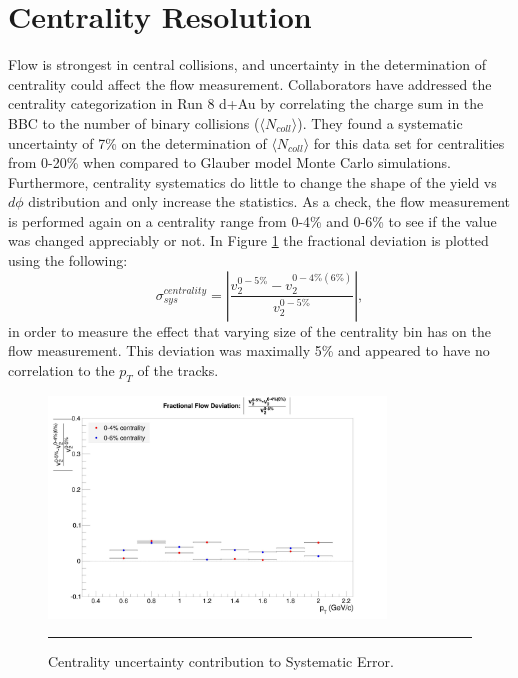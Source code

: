 \section{Centrality Resolution}
\label{sectcenterr}
Flow is strongest in central collisions, and uncertainty in the determination of centrality could affect the flow measurement. Collaborators have addressed the centrality categorization in Run 8 d+Au \citep{phenixcentrality} by correlating the charge sum in the BBC to the number of binary collisions ($\langle N_{coll} \rangle$). They found a systematic uncertainty of 7\% on the determination of $\langle N_{coll} \rangle$ for this data set for centralities from 0-20\% when compared to Glauber model Monte Carlo simulations. Furthermore, centrality systematics do little to change the shape of the yield vs $d\phi$ distribution and only increase the statistics. As a check, the flow measurement is performed again on a centrality range from 0-4\% and 0-6\% to see if the value was changed appreciably or not. In Figure \ref{fig:centsys} the fractional deviation is plotted using the following:
\begin{equation}
\sigma_{sys}^{centrality} = \left| \frac{v_{2}^{0-5\%}-v_{2}^{0-4\%(6\%)}}{v_{2}^{0-5\%}} \right|,
\end{equation}
in order to measure the effect that varying size of the centrality bin has on the flow measurement. This deviation was maximally 5\% and appeared to have no correlation to the $p_T$ of the tracks.

\begin{figure}[htbp]
  \centering
    \includegraphics[width=0.8\textwidth]{evtQA/CentSysErrs.jpg}
    \rule{35em}{0.5pt}
  \caption[Centrality uncertainty contribution to Systematic Error.]{Centrality uncertainty contribution to Systematic Error.}
  \label{fig:centsys}
\end{figure}


